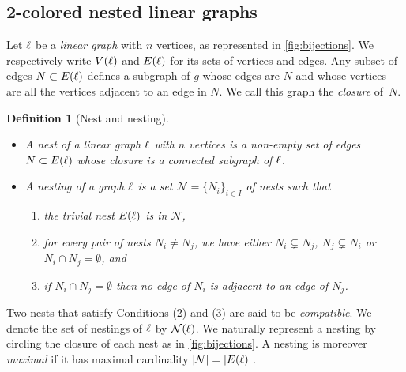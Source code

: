 \documentclass[twoside, 11pt]{amsart}
\newtheorem{definition}{Definition}[section]
\theoremstyle{remark}
\begin{document}

\subsection{2-colored nested linear graphs} \label{ss:2-col}

Let $\ell$ be a \emph{linear graph} with $n$ vertices, as represented in \cref{fig:bijections}.
We respectively write $V(\ell)$ and $E(\ell)$ for its sets of vertices and edges.
Any subset of edges $N\subset E(\ell)$ defines a subgraph of $g$ whose edges are $N$ and whose vertices are all the vertices adjacent to an edge in $N$. 
We call this graph the \emph{closure} of~$N$. 

\begin{definition}[Nest and nesting]
\leavevmode
\begin{itemize}[leftmargin=*]
\item A \emph{nest} of a linear graph $\ell$ with $n$ vertices is a non-empty set of edges $N \subset E(\ell)$ whose closure is a connected subgraph of $\ell$.  
\item A \emph{nesting} of a graph $\ell$ is a set $\mathcal{N}=\{N_i\}_{i\in I}$ of nests such that 
\begin{enumerate}[leftmargin=*]
    \item the \emph{trivial nest} $E(\ell)$ is in $\mathcal{N}$,
    \item for every pair of nests $N_i\neq N_j$, we have either $N_i \subsetneq N_j$, $N_j \subsetneq N_i$ or $N_i \cap N_j = \emptyset$, and
    \item if $N_i \cap N_j = \emptyset$ then no edge of $N_i$ is adjacent to an edge of $N_j$.
\end{enumerate}
\end{itemize}
\end{definition}

Two nests that satisfy Conditions (2) and (3) are said to be \textit{compatible}. 
We denote the set of nestings of $\ell$ by $\mathcal{N}(\ell)$. 
We naturally represent a nesting by circling the closure of each nest as in \cref{fig:bijections}. 
A nesting is moreover \emph{maximal} if it has maximal cardinality $|\mathcal{N}|=|E(\ell)|$.
\end{document}
